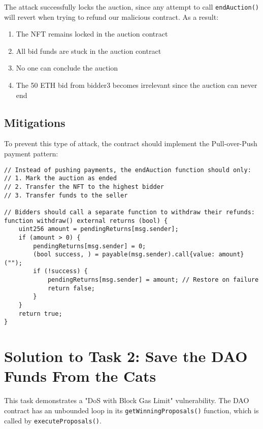 \documentclass[12pt]{article}
\begin{document}
The attack successfully locks the auction, since any attempt to call \texttt{endAuction()} will revert when trying to refund our malicious contract. As a result:

\begin{enumerate}
\item The NFT remains locked in the auction contract
\item All bid funds are stuck in the auction contract
\item No one can conclude the auction
\item The 50 ETH bid from bidder3 becomes irrelevant since the auction can never end
\end{enumerate}

\subsection*{Mitigations}

To prevent this type of attack, the contract should implement the Pull-over-Push payment pattern:

\noindent
\begin{minipage}{\textwidth}
\begin{verbatim}
// Instead of pushing payments, the endAuction function should only:
// 1. Mark the auction as ended
// 2. Transfer the NFT to the highest bidder
// 3. Transfer funds to the seller

// Bidders should call a separate function to withdraw their refunds:
function withdraw() external returns (bool) {
    uint256 amount = pendingReturns[msg.sender];
    if (amount > 0) {
        pendingReturns[msg.sender] = 0;
        (bool success, ) = payable(msg.sender).call{value: amount}("");
        if (!success) {
            pendingReturns[msg.sender] = amount; // Restore on failure
            return false;
        }
    }
    return true;
}
\end{verbatim}
\end{minipage}

\section*{Solution to Task 2: Save the DAO Funds From the Cats}

This task demonstrates a "DoS with Block Gas Limit" vulnerability. The DAO contract has an unbounded loop in its \texttt{getWinningProposals()} function, which is called by \texttt{executeProposals()}.
\end{document}
